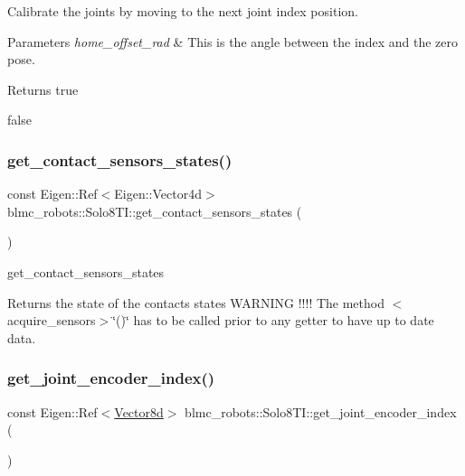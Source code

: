 Calibrate the joints by moving to the next joint index position. 


\begin{DoxyParams}{Parameters}
{\em home\+\_\+offset\+\_\+rad} & This is the angle between the index and the zero pose. \\
\hline
\end{DoxyParams}
\begin{DoxyReturn}{Returns}
true 

false 
\end{DoxyReturn}
\mbox{\label{classblmc__robots_1_1Solo8TI_aef169a78898e5ee8aaadc63942c3b7b6}} 
\subsubsection{\texorpdfstring{get\+\_\+contact\+\_\+sensors\+\_\+states()}{get\_contact\_sensors\_states()}}
{\footnotesize\ttfamily const Eigen\+::\+Ref$<$Eigen\+::\+Vector4d$>$ blmc\+\_\+robots\+::\+Solo8\+T\+I\+::get\+\_\+contact\+\_\+sensors\+\_\+states (\begin{DoxyParamCaption}{ }\end{DoxyParamCaption})\hspace{0.3cm}{\ttfamily [inline]}}



get\+\_\+contact\+\_\+sensors\+\_\+states 

\begin{DoxyReturn}{Returns}
the state of the contacts states W\+A\+R\+N\+I\+NG !!!! The method $<$acquire\+\_\+sensors$>$\char`\"{}()\char`\"{} has to be called prior to any getter to have up to date data. 
\end{DoxyReturn}
\mbox{\label{classblmc__robots_1_1Solo8TI_a64832124d666033300a2d163db799f8a}} 
\subsubsection{\texorpdfstring{get\+\_\+joint\+\_\+encoder\+\_\+index()}{get\_joint\_encoder\_index()}}
{\footnotesize\ttfamily const Eigen\+::\+Ref$<$\hyperlink{common__header_8hpp_a98975ffbe0bca1296078e0350dfedd60}{Vector8d}$>$ blmc\+\_\+robots\+::\+Solo8\+T\+I\+::get\+\_\+joint\+\_\+encoder\+\_\+index (\begin{DoxyParamCaption}{ }\end{DoxyParamCaption})\hspace{0.3cm}{\ttfamily [inline]}}




